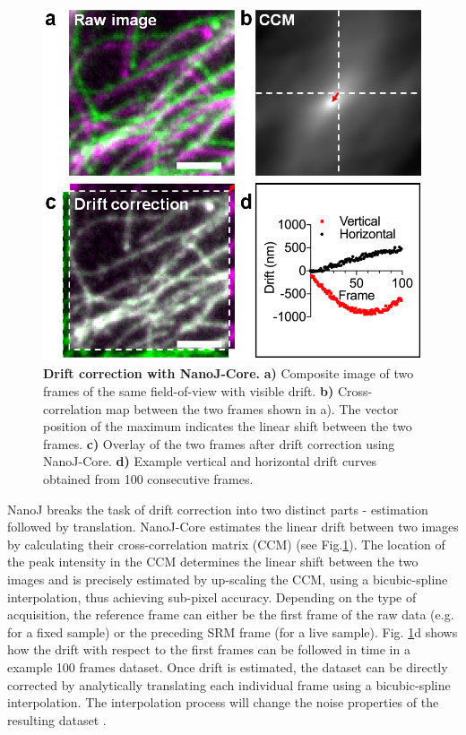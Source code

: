  \begin{figure}[!t]
    \centering
    \includegraphics[width=\linewidth]{Figures/FigureDrift_v1.png}
    \caption{\textbf{Drift correction with NanoJ-Core.} \textbf{a)} Composite image of two frames of the same field-of-view with visible drift. \textbf{b)} Cross-correlation map between the two frames shown in a). The vector position of the maximum indicates the linear shift between the two frames. \textbf{c)} Overlay of the two frames after drift correction using NanoJ-Core. \textbf{d)} Example vertical and horizontal drift curves obtained from 100 consecutive frames.}
    \label{fig:DriftCorrection}
 \end{figure}

 NanoJ breaks the task of drift correction into two distinct parts - estimation followed by translation. NanoJ-Core estimates the linear drift between two images by calculating their cross-correlation matrix (CCM) (see Fig.\ref{fig:DriftCorrection}). The location of the peak intensity in the CCM determines the linear shift between the two images and is precisely estimated by up-scaling the CCM, using a bicubic-spline interpolation, thus achieving sub-pixel accuracy. Depending on the type of acquisition, the reference frame can either be the first frame of the raw data (e.g. for a fixed sample) or the preceding SRM frame (for a live sample). Fig. \ref{fig:DriftCorrection}d shows how the drift with respect to the first frames can be followed in time in a example 100 frames dataset. Once drift is estimated, the dataset can be directly corrected by analytically translating each individual frame using a bicubic-spline interpolation. The interpolation process will change the noise properties of the resulting dataset \cite{blaysat2016effect}.
 
